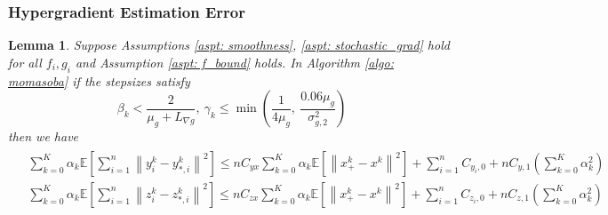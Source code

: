 \documentclass[10pt]{article}
\newtheorem{lemma}{Lemma}[section]
\theoremstyle{remark}
\newcommand{\E}{\mathbb{E}}
\newcommand{\norm}[1]{\left\|#1\right\|}
\begin{document}
\subsubsection{Hypergradient Estimation Error}
\begin{lemma}\label{lem: yz_error_minmax}
Suppose Assumptions \ref{aspt: smoothness}, \ref{aspt: stochastic_grad} hold for all $f_i, g_i$ and Assumption \ref{aspt: f_bound} holds. In Algorithm \ref{algo: momasoba} if the stepsizes satisfy
    \begin{equation}\label{ineq: beta_gamma_condition}
        \beta_k < \frac{2}{\mu_g + L_{\nabla g}},\ \gamma_k \leq \min\left(\frac{1}{4\mu_g},\ \frac{0.06\mu_g}{\sigma_{g,2}^2}\right)
    \end{equation}
    then we have
    \begin{align}
        \begin{aligned}
            &\sum_{k=0}^{K}\alpha_k\E\left[\sum_{i=1}^{n}\norm{y_i^k - y_{*,i}^k}^2\right] \leq nC_{yx}\sum_{k=0}^{K}\alpha_k\E\left[\norm{x_+^k - x^k}^2\right] + \sum_{i=1}^{n}C_{y_i, 0} +  nC_{y,1}\left(\sum_{k=0}^{K}\alpha_k^2\right) \\
        &\sum_{k=0}^{K}\alpha_k\E\left[\sum_{i=1}^{n}\norm{z_i^k-z_{*,i}^k}^2\right] \leq nC_{zx}\sum_{k=0}^{K}\alpha_k\E\left[\norm{x_+^k - x^k}^2\right] + \sum_{i=1}^{n}C_{z_i, 0} +  nC_{z,1}\left(\sum_{k=0}^{K}\alpha_k^2\right)

\end{aligned}
\end{align}
\end{lemma}
\end{document}
